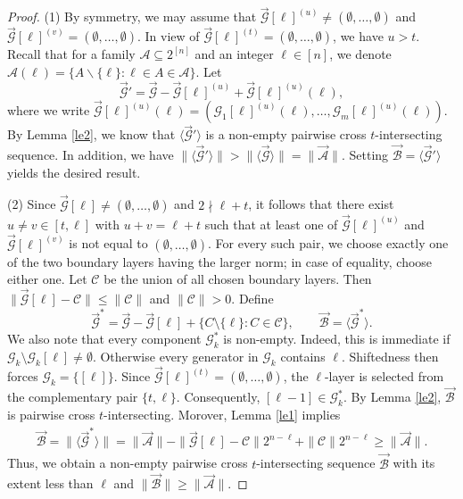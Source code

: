 \documentclass[10pt,a4paper]{amsart}
\begin{document}
\begin{proof}
(1)  By symmetry, we may assume that $\vec{\mathcal{G}}[\ell]^{(u)}\neq (\emptyset,\ldots, \emptyset)$ and $\vec{\mathcal{G}}[\ell]^{(v)}= (\emptyset,\ldots, \emptyset)$.
In view of $\vec{\mathcal{G}}[\ell]^{(t)}=(\emptyset,\ldots,\emptyset)$, we have $u>t$.
Recall that for a family $\mathcal{A}\subseteq 2^{[n]}$ and an integer $\ell \in [n]$, we denote $\mathcal{A}(\ell) = \{A\backslash \{\ell\}: \ell\in A\in \mathcal{A}\}$.
Let  
$$ \vec{\mathcal{G}}'= \vec{\mathcal{G}}- \vec{\mathcal{G}}[\ell]^{(u)}+\vec{\mathcal{G}}[\ell]^{(u)}(\ell),$$
where we write $\vec{\mathcal{G}}[\ell]^{(u)}(\ell)= \left(\mathcal{G}_1[\ell]^{(u)}(\ell),\ldots, \mathcal{G}_m[\ell]^{(u)}(\ell) \right)$. 
By Lemma \ref{le2}, we know that $ \langle\vec{\mathcal{G}}'\rangle$ is a non-empty
pairwise cross $t$-intersecting sequence. In addition, we have $\|\langle\vec{\mathcal{G}}'\rangle\|>\|\langle\vec{\mathcal{G}}\rangle\|=\|\vec{\mathcal{A}}\|$. Setting $\vec{\mathcal{B}}=\langle\vec{\mathcal{G}}'\rangle$ yields the desired result.




(2)   
Since $\vec{\mathcal{G}}[\ell]\neq (\emptyset,\ldots, \emptyset)$  and $2\nmid \ell+t$, it follows  that there exist $u\neq v\in [t,\ell]$ with  $u+v=\ell+t$ such that at least one of $\vec{\mathcal{G}}[\ell]^{(u)}$ and $\vec{\mathcal{G}}[\ell]^{(v)}$ is not equal to  $(\emptyset,\ldots, \emptyset)$. 
For every such pair,  we choose exactly one of the two boundary layers having
the larger norm; in case of equality, choose either one.
Let $\mathcal C$ be the union of all chosen boundary layers.
Then $\|\vec{\mathcal{G}}[\ell]- \mathcal C\|\leq \|\mathcal C\|$ and $ \|\mathcal C\|>0$.
Define 
$$
\vec{\mathcal{G}}^*
=
\vec{\mathcal{G}}-\vec{\mathcal{G}}[\ell]+
\{C\setminus\{\ell\}:C\in\mathcal C\},\qquad \vec{\mathcal{B}}=\langle\vec{\mathcal{G}}^*\rangle.
$$
We also note that every component $\mathcal G_k^{*}$ is non-empty.
Indeed, this is immediate if
$\mathcal G_k\setminus\mathcal G_k[\ell]\ne\emptyset$.
Otherwise every generator in $\mathcal G_k$ contains $\ell$.
Shiftedness then forces $\mathcal G_k=\{[\ell]\}$. Since
$\vec{\mathcal G}[\ell]^{(t)}=(\emptyset,\ldots,\emptyset)$, the
$\ell$-layer is selected from the complementary pair $\{t,\ell\}$.
Consequently, $[\ell-1]\in\mathcal G_k^{*}$.
By  Lemma \ref{le2}, $\vec{\mathcal{B}}$ is pairwise cross $t$-intersecting. 
Morover, Lemma \ref{le1} implies
\begin{align*}
\vec{\mathcal{B}}=\|\langle \vec{\mathcal{G}}^*\rangle\| =\|\vec{\mathcal{A}}\|-\|\vec{\mathcal{G}}[\ell]-\mathcal C\|2^{n-\ell}+\|\mathcal C\|2^{n-\ell}\geq \|\vec{\mathcal{A}}\|.
\end{align*}
Thus, we obtain  a  non-empty pairwise cross $t$-intersecting sequence $\vec{\mathcal{B}}$  with its extent less than $\ell$ and $\|\vec{\mathcal{B}}\|\geq \|\vec{\mathcal{A}}\|$.



\end{proof}
\end{document}
